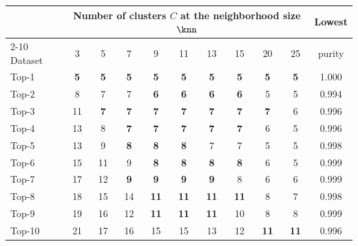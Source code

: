 \begin{tabular*}{\linewidth}{@{\extracolsep{\fill}}lccccccccc@{\hspace{1.2em}}c@{}}
\toprule
 & \multicolumn{9}{c}{Number of clusters $C$ at the neighborhood size $\knn$} & Lowest\\
\cmidrule(lr){2-10}
Dataset & 3 & 5 & 7 & 9 & 11 & 13 & 15 & 20 & 25 & purity\\
\midrule
Top-1 & \textbf{5} & \textbf{5} & \textbf{5} & \textbf{5} & \textbf{5} & \textbf{5} & \textbf{5} & \textbf{5} & \textbf{5} & 1.000\\
Top-2 & 8 & 7 & 7 & \textbf{6} & \textbf{6} & \textbf{6} & \textbf{6} & 5 & 5 & 0.994\\
Top-3 & 11 & \textbf{7} & \textbf{7} & \textbf{7} & \textbf{7} & \textbf{7} & \textbf{7} & \textbf{7} & 6 & 0.996\\
Top-4 & 13 & 8 & \textbf{7} & \textbf{7} & \textbf{7} & \textbf{7} & \textbf{7} & 6 & 5 & 0.996\\
Top-5 & 13 & 9 & \textbf{8} & \textbf{8} & \textbf{8} & 7 & 7 & 5 & 5 & 0.998\\
Top-6 & 15 & 11 & 9 & \textbf{8} & \textbf{8} & \textbf{8} & \textbf{8} & 6 & 5 & 0.999\\
Top-7 & 17 & 12 & \textbf{9} & \textbf{9} & \textbf{9} & \textbf{9} & 8 & 6 & 6 & 0.999\\
Top-8 & 18 & 15 & 14 & \textbf{11} & \textbf{11} & \textbf{11} & \textbf{11} & 8 & 7 & 0.998\\
Top-9 & 19 & 16 & 12 & \textbf{11} & \textbf{11} & \textbf{11} & 10 & 8 & 8 & 0.999\\
Top-10 & 21 & 17 & 16 & 15 & 15 & 13 & 12 & \textbf{11} & \textbf{11} & 0.996\\
\bottomrule
\end{tabular*}
